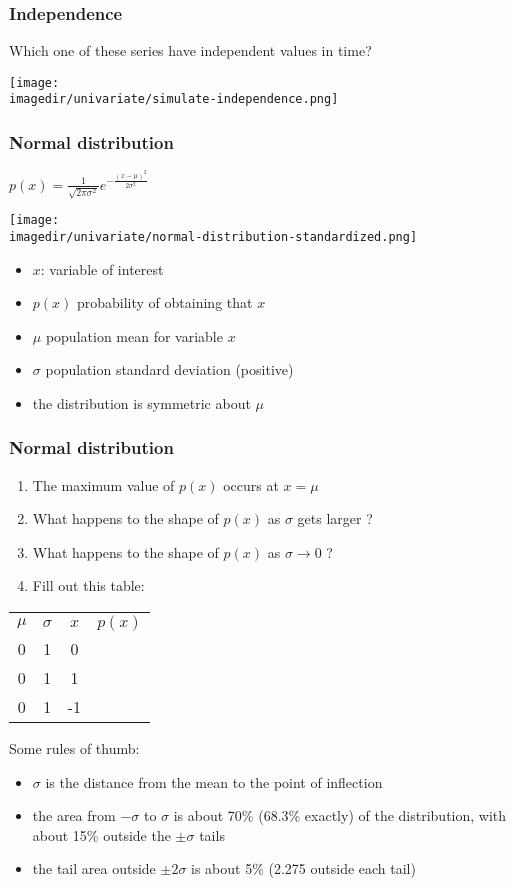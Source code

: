 \begin{frame}\frametitle{Independence}

	Which one of these series have independent values in time?

	\texttt{[image: \\imagedir/univariate/simulate-independence.png]}
\end{frame}

\begin{frame}\frametitle{Normal distribution}

	$ p(x) = \displaystyle \frac{1}{\sqrt{2\pi \sigma^2}}e^{-\frac{\displaystyle (x-\mu)^2}{\displaystyle 2\sigma^2}} $
	\begin{center}
		\texttt{[image: \\imagedir/univariate/normal-distribution-standardized.png]}
	\end{center}
	\begin{itemize}
		\item $x$: variable of interest
		\item $p(x)$ probability of obtaining that $x$
		\item $\mu$ population mean for variable $x$
		\item $\sigma$ population standard deviation (positive)
		\item the distribution is symmetric about $\mu$
	\end{itemize}
\end{frame}

\begin{frame}\frametitle{Normal distribution}
	\begin{enumerate}
		\item The maximum value of $p(x)$ occurs at $x = \mu$
		\item What happens to the shape of $p(x)$ as $\sigma$ gets larger ?
		\item What happens to the shape of $p(x)$ as $\sigma \rightarrow 0$ ?
		\item Fill out this table:
	\end{enumerate}
	\begin{tabular}{cccc}
		$\mu$		&	$\sigma$ 	&	$x$		&	$p(x)$\\
		0 			&  	1			& 	0 		&		  \\
		0 			&	1			& 	1		&  		  \\
		0 			&	1			& 	-1		&  		  
	\end{tabular}
	Some rules of thumb:
	\begin{itemize}
		\item $\sigma$ is the distance from the mean to the point of inflection
		\item the area from $-\sigma$ to $\sigma$ is about 70\% (68.3\% exactly) of the distribution, with about 15\% outside the $\pm \sigma$ tails
		\item the tail area outside $\pm 2\sigma$ is about 5\% (2.275 outside each tail)
	\end{itemize}
\end{frame}

